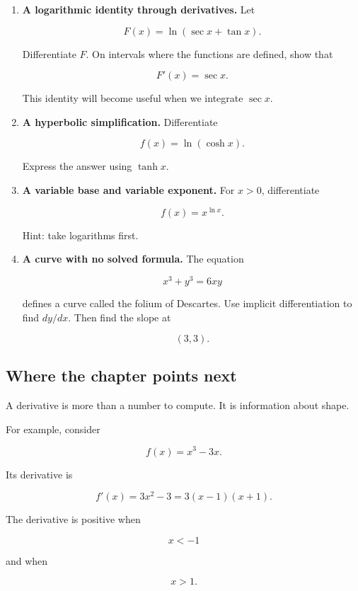 \begin{enumerate}
\[
f(x)=\frac{1-\cos x}{\sin x}
\]

where it is defined.  Then use trigonometric identities to simplify the derivative.

\item \textbf{A logarithmic identity through derivatives.}
Let

\[
F(x)=\ln(\sec x+\tan x).
\]

Differentiate \(F\).  On intervals where the functions are defined, show that

\[
F'(x)=\sec x.
\]

This identity will become useful when we integrate \(\sec x\).

\item \textbf{A hyperbolic simplification.}
Differentiate

\[
f(x)=\ln(\cosh x).
\]

Express the answer using \(\tanh x\).

\item \textbf{A variable base and variable exponent.}
For \(x>0\), differentiate

\[
f(x)=x^{\ln x}.
\]

Hint: take logarithms first.

\item \textbf{A curve with no solved formula.}
The equation

\[
x^3+y^3=6xy
\]

defines a curve called the folium of Descartes.  Use implicit differentiation to find \(dy/dx\).  Then find the slope at

\[
(3,3).
\]
\end{enumerate}

\subsection{Where the chapter points next}
\label{subsec:chapter-5-hook-shape}

A derivative is more than a number to compute.  It is information about shape.

For example, consider

\[
f(x)=x^3-3x.
\]

Its derivative is

\[
f'(x)=3x^2-3=3(x-1)(x+1).
\]

The derivative is positive when

\[
x<-1
\]

and when

\[
x>1.
\]


